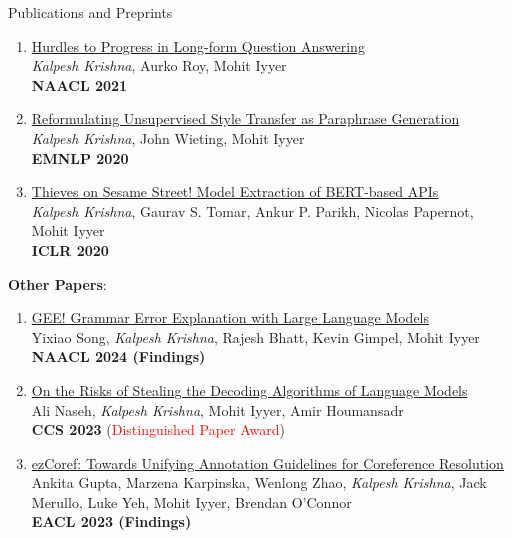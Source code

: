 \documentclass{resume} %
\begin{document}
\begin{rSection}{Publications and Preprints}
\begin{enumerate}[leftmargin=*]
\item \href{https://arxiv.org/abs/2103.06332}{Hurdles to Progress in Long-form Question Answering} \\
\textit{Kalpesh Krishna}, Aurko Roy, Mohit Iyyer \\
\textbf{NAACL 2021}
\item \href{https://arxiv.org/abs/2010.05700}{Reformulating Unsupervised Style Transfer as Paraphrase Generation} \\ \textit{Kalpesh Krishna}, John Wieting, Mohit Iyyer \\ \textbf{EMNLP 2020} 
\item \href{https://arxiv.org/abs/1910.12366}{Thieves on Sesame Street! Model Extraction of BERT-based APIs} \\ \textit{Kalpesh Krishna}, Gaurav S. Tomar, Ankur P. Parikh, Nicolas Papernot, Mohit Iyyer \\ \textbf{ICLR 2020}

\end{enumerate}

\vspace{0.1in}

\textbf{Other Papers}:
\begin{enumerate}[leftmargin=*]
\setlength\itemsep{0.4em}
\setcounter{enumi}{8}

\item \href{https://arxiv.org/abs/2311.09517}{GEE! Grammar Error Explanation with Large Language Models} \\
Yixiao Song, \emph{Kalpesh Krishna}, Rajesh Bhatt, Kevin Gimpel, Mohit Iyyer \\ \textbf{NAACL 2024 (Findings)}

\item \href{https://arxiv.org/abs/2303.04729}{On the Risks of Stealing the Decoding Algorithms of Language Models} \\
Ali Naseh, \emph{Kalpesh Krishna}, Mohit Iyyer, Amir Houmansadr \\
\textbf{CCS 2023} (\textcolor{red}{Distinguished Paper Award})


\item \href{https://arxiv.org/abs/2210.07188}{ezCoref: Towards Unifying Annotation Guidelines for Coreference Resolution} \\
Ankita Gupta, Marzena Karpinska, Wenlong Zhao, \emph{Kalpesh Krishna}, Jack Merullo, Luke Yeh, Mohit Iyyer, Brendan O'Connor \\
\textbf{EACL 2023 (Findings)}



\end{enumerate}
\end{rSection}
\end{document}
